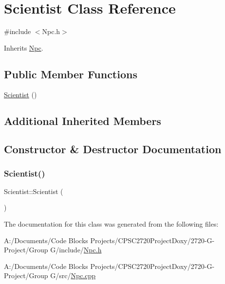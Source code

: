 \hypertarget{class_scientist}{}\section{Scientist Class Reference}
\label{class_scientist}


{\ttfamily \#include $<$Npc.\+h$>$}



Inherits \mbox{\hyperlink{class_npc}{Npc}}.

\subsection*{Public Member Functions}
\begin{DoxyCompactItemize}
\item 
\mbox{\hyperlink{class_scientist_a600159be9458cb68b863e294b1fe884e}{Scientist}} ()
\end{DoxyCompactItemize}
\subsection*{Additional Inherited Members}


\subsection{Constructor \& Destructor Documentation}
\mbox{\label{class_scientist_a600159be9458cb68b863e294b1fe884e}} 
\subsubsection{\texorpdfstring{Scientist()}{Scientist()}}
{\footnotesize\ttfamily Scientist\+::\+Scientist (\begin{DoxyParamCaption}{ }\end{DoxyParamCaption})}



The documentation for this class was generated from the following files\+:\begin{DoxyCompactItemize}
\item 
A\+:/\+Documents/\+Code Blocks Projects/\+C\+P\+S\+C2720\+Project\+Doxy/2720-\/\+G-\/\+Project/\+Group G/include/\mbox{\hyperlink{_npc_8h}{Npc.\+h}}\item 
A\+:/\+Documents/\+Code Blocks Projects/\+C\+P\+S\+C2720\+Project\+Doxy/2720-\/\+G-\/\+Project/\+Group G/src/\mbox{\hyperlink{_npc_8cpp}{Npc.\+cpp}}\end{DoxyCompactItemize}
